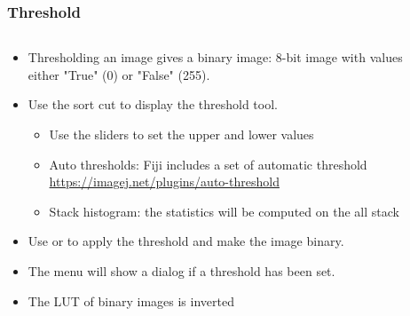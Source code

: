 \documentclass[ignorenonframetext,aspectratio=169,10pt,xcolor=table]{beamer}
\begin{document}
\begin{frame} \frametitle{Threshold}
  \begin{columns}
    \begin{column}{0.7\textwidth}
      \begin{itemize} \setlength\itemsep{1em}
      \item Thresholding an image gives a binary image: 8-bit image with
        values either "True" (0) or "False" (255).
      \item Use the sort cut  to display the threshold
        tool.
        \begin{itemize}
        \item Use the sliders to set the upper and lower values
        \item Auto thresholds: Fiji includes a set of automatic threshold
          \url{https://imagej.net/plugins/auto-threshold}
        \item Stack histogram: the statistics will be computed on the all
          stack
        \end{itemize}
      \item Use  or  to
        apply the threshold and make the image binary.
      \item The menu  will show a dialog
        if a threshold has been set.
      \item The LUT of binary images is inverted
      \end{itemize}
    \end{column}
    \begin{column}{0.3\textwidth} \centering

\end{column}
\end{columns}
\end{frame}
\end{document}
